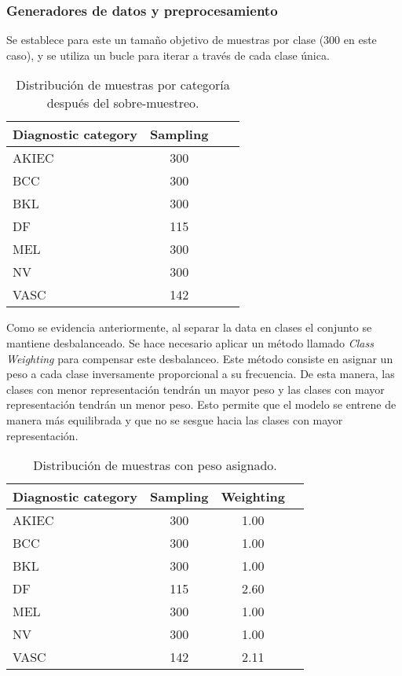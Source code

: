 \subsubsection*{Generadores de datos y preprocesamiento}

Se establece para este un tamaño objetivo de muestras por clase ($300$ en este caso), y se utiliza un bucle para iterar a través de cada clase única.

\begin{table}[ht]
   \centering
   \begin{tabular}{lccc}
   \hline
   Diagnostic category & Sampling  \\ \hline
   AKIEC & 300 \\
   BCC & 300 \\
   BKL & 300 \\
   DF & 115 \\
   MEL & 300 \\
   NV & 300 \\
   VASC & 142 \\ \hline
   \end{tabular}
   \caption{Distribución de muestras por categoría después del sobre-muestreo.}
   \label{tab:sampling_distribution_1}
   \end{table}


Como se evidencia anteriormente, al separar la data en clases el conjunto se mantiene desbalanceado. Se hace necesario aplicar un método llamado \textit{Class Weighting} para compensar este desbalanceo. Este método consiste en asignar un peso a cada clase inversamente proporcional a su frecuencia. De esta manera, las clases con menor representación tendrán un mayor peso y las clases con mayor representación tendrán un menor peso. Esto permite que el modelo se entrene de manera más equilibrada y que no se sesgue hacia las clases con mayor representación.

\begin{table}[ht]
   \centering
   \begin{tabular}{lccc}
   \hline
   Diagnostic category & Sampling  & Weighting\\ \hline
   AKIEC & 300 & 1.00\\
   BCC & 300 & 1.00\\
   BKL & 300 & 1.00\\
   DF & 115 & 2.60\\
   MEL & 300 & 1.00\\
   NV & 300 & 1.00\\
   VASC & 142 & 2.11\\ \hline
   \end{tabular}
   \caption{Distribución de muestras con peso asignado.}
   \label{tab:weighting_distribution}
   \end{table}

